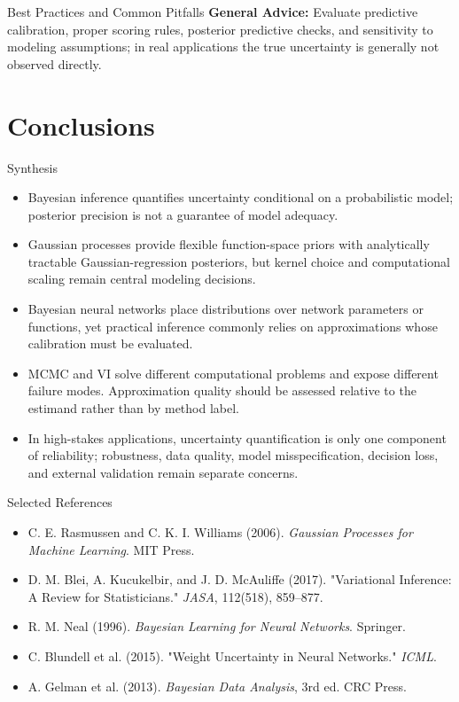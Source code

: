 \documentclass[aspectratio=169,11pt]{beamer}
\begin{document}
\begin{frame}{Best Practices and Common Pitfalls}
\vspace{0.3cm}
\textbf{General Advice:} Evaluate predictive calibration, proper scoring rules, posterior predictive checks, and sensitivity to modeling assumptions; in real applications the true uncertainty is generally not observed directly.
\end{frame}

\section{Conclusions}

\begin{frame}{Synthesis}
  \begin{itemize}
    \item Bayesian inference quantifies uncertainty conditional on a probabilistic model; posterior precision is not a guarantee of model adequacy.
    \item Gaussian processes provide flexible function-space priors with analytically tractable Gaussian-regression posteriors, but kernel choice and computational scaling remain central modeling decisions.
    \item Bayesian neural networks place distributions over network parameters or functions, yet practical inference commonly relies on approximations whose calibration must be evaluated.
    \item MCMC and VI solve different computational problems and expose different failure modes. Approximation quality should be assessed relative to the estimand rather than by method label.
    \item In high-stakes applications, uncertainty quantification is only one component of reliability; robustness, data quality, model misspecification, decision loss, and external validation remain separate concerns.
  \end{itemize}
\end{frame}

\begin{frame}{Selected References}
  \small
  \begin{itemize}
    \item C. E. Rasmussen and C. K. I. Williams (2006). \textit{Gaussian Processes for Machine Learning}. MIT Press.
    \item D. M. Blei, A. Kucukelbir, and J. D. McAuliffe (2017). "Variational Inference: A Review for Statisticians." \textit{JASA}, 112(518), 859--877.
    \item R. M. Neal (1996). \textit{Bayesian Learning for Neural Networks}. Springer.
    \item C. Blundell et al. (2015). "Weight Uncertainty in Neural Networks." \textit{ICML}.
    \item A. Gelman et al. (2013). \textit{Bayesian Data Analysis}, 3rd ed. CRC Press.
  \end{itemize}
\end{frame}

\contactslide
\end{document}
